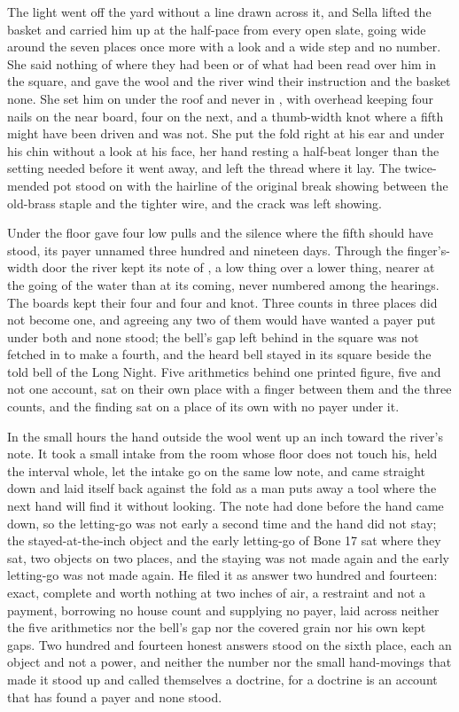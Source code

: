 The light went off the yard without a line drawn across it, and Sella lifted the basket and carried him up at the half-pace from every open slate, going wide around the seven places once more with a look and a wide step and no number. She said nothing of where they had been or of what had been read over him in the square, and gave the wool and the river wind their instruction and the basket none. She set him on  under the roof and never in , with  overhead keeping four nails on the near board, four on the next, and a thumb-width knot where a fifth might have been driven and was not. She put the fold right at his ear and under his chin without a look at his face, her hand resting a half-beat longer than the setting needed before it went away, and left the thread where it lay. The twice-mended pot stood on  with the hairline of the original break showing between the old-brass staple and the tighter wire, and the crack was left showing.

Under the floor  gave four low pulls and the silence where the fifth should have stood, its payer unnamed three hundred and nineteen days. Through the finger's-width door the river kept its note of , a low thing over a lower thing, nearer at the going of the water than at its coming, never numbered among the hearings. The boards kept their four and four and knot. Three counts in three places did not become one, and agreeing any two of them would have wanted a payer put under both and none stood; the bell's gap left behind in the square was not fetched in to make a fourth, and the heard bell stayed in its square beside the told bell of the Long Night. Five arithmetics behind one printed figure, five and not one account, sat on their own place with a finger between them and the three counts, and the finding sat on a place of its own with no payer under it.

In the small hours the hand outside the wool went up an inch toward the river's note. It took a small intake from the room whose floor does not touch his, held the interval whole, let the intake go on the same low note, and came straight down and laid itself back against the fold as a man puts away a tool where the next hand will find it without looking. The note had done before the hand came down, so the letting-go was not early a second time and the hand did not stay; the stayed-at-the-inch object and the early letting-go of Bone 17 sat where they sat, two objects on two places, and the staying was not made again and the early letting-go was not made again. He filed it as answer two hundred and fourteen: exact, complete and worth nothing at two inches of air, a restraint and not a payment, borrowing no house count and supplying no payer, laid across neither the five arithmetics nor the bell's gap nor the covered grain nor his own kept gaps. Two hundred and fourteen honest answers stood on the sixth place, each an object and not a power, and neither the number nor the small hand-movings that made it stood up and called themselves a doctrine, for a doctrine is an account that has found a payer and none stood.


